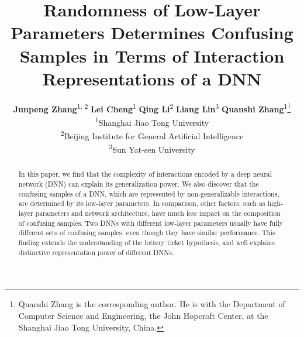 \documentclass[10pt,twocolumn,letterpaper]{article}
\begin{document}
\theoremstyle{plain}
\theoremstyle{definition}
\theoremstyle{remark}
\newtheorem{phenomenon}{Phenomenon}


\title{Randomness of Low-Layer Parameters Determines Confusing Samples in Terms of Interaction Representations of a DNN}

\author{
    \textbf{Junpeng Zhang}\textsuperscript{1, 2} \quad
    \textbf{Lei Cheng}\textsuperscript{1} \quad
    \textbf{Qing Li}\textsuperscript{2} \quad
    \textbf{Liang Lin}\textsuperscript{3} \quad
    \textbf{Quanshi Zhang}\textsuperscript{1}\thanks{Quanshi Zhang is the corresponding author. He is with the Department of Computer Science and Engineering, the John Hopcroft Center, at the Shanghai Jiao Tong University, China.} \\
    \textsuperscript{1}Shanghai Jiao Tong University \\
    \textsuperscript{2}Beijing Institute for General Artificial Intelligence \\
    \textsuperscript{3}Sun Yat-sen University \\
}





\maketitle

\begin{abstract}
In this paper, we find that the complexity of interactions encoded by a deep neural network (DNN) can explain its generalization power. We also discover that the confusing samples of a DNN, which are represented by non-generalizable interactions, are determined by its low-layer parameters. In comparison, other factors, such as high-layer parameters and network architecture, have much less impact on the composition of confusing samples. Two DNNs with different low-layer parameters usually have fully different sets of confusing samples, even though they have similar performance. This finding extends the understanding of the lottery ticket hypothesis, and well explains distinctive representation power of different DNNs.
\end{abstract}
\end{document}
